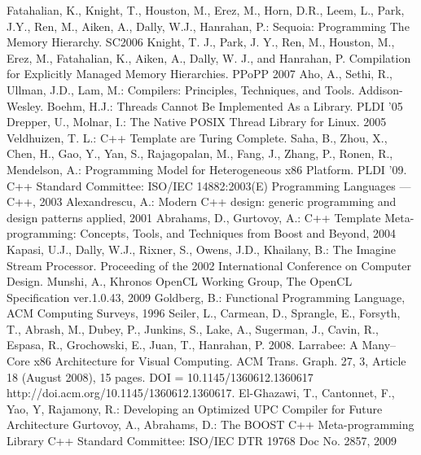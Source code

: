 \documentclass[10pt, conference, compsocconf]{IEEEtran}
\begin{document}
\begin{thebibliography}{99}
\setlength{\itemsep}{1mm}
 Fatahalian, K., Knight, T., Houston, M., Erez, M., Horn, D.R., Leem, L., Park, J.Y., Ren, M., Aiken, A., Dally, W.J., Hanrahan, P.: Sequoia: Programming The Memory Hierarchy. SC2006
 Knight, T. J., Park, J. Y., Ren, M., Houston, M., Erez, M., Fatahalian, K., Aiken, A., Dally, W. J., and Hanrahan, P. Compilation for Explicitly Managed Memory Hierarchies. PPoPP 2007
 Aho, A., Sethi, R., Ullman, J.D., Lam, M.: Compilers: Principles, Techniques, and Tools. Addison-Wesley. 
 Boehm, H.J.: Threads Cannot Be Implemented As a Library. PLDI '05
 Drepper, U., Molnar, I.: The Native POSIX Thread Library for Linux. 2005
 Veldhuizen, T. L.: C++ Template are Turing Complete. 
 Saha, B., Zhou, X., Chen, H., Gao, Y., Yan, S., Rajagopalan, M., Fang, J., Zhang, P., Ronen, R., Mendelson, A.: Programming Model for Heterogeneous x86 Platform. PLDI '09.
 C++ Standard Committee: ISO/IEC 14882:2003(E) Programming Languages — C++, 2003
 Alexandrescu, A.: Modern C++ design: generic programming and design patterns applied, 2001
 Abrahams, D., Gurtovoy, A.: C++ Template Meta-programming: Concepts, Tools, and Techniques from Boost and Beyond, 2004
 Kapasi, U.J., Dally, W.J., Rixner, S., Owens, J.D., Khailany, B.: The Imagine Stream Processor. Proceeding of the 2002 International Conference on Computer Design.
 Munshi, A., Khronos OpenCL Working Group, The OpenCL Specification ver.1.0.43, 2009
 Goldberg, B.: Functional Programming Language, ACM Computing Surveys, 1996
 Seiler, L., Carmean, D., Sprangle, E., Forsyth, T., Abrash, M., Dubey, P., Junkins, S., Lake, A., Sugerman, J., Cavin, R., Espasa, R., Grochowski, E., Juan, T., Hanrahan, P. 2008. Larrabee: A Many–Core x86 Architecture for Visual Computing. ACM Trans. Graph. 27, 3, Article 18 (August 2008), 15 pages. DOI = 10.1145/1360612.1360617 http://doi.acm.org/10.1145/1360612.1360617. 
 El-Ghazawi, T., Cantonnet, F., Yao, Y, Rajamony, R.: Developing an Optimized UPC Compiler for Future Architecture
 Gurtovoy, A., Abrahams, D.: The BOOST C++ Meta-programming Library
 C++ Standard Committee: ISO/IEC DTR 19768 Doc No. 2857, 2009
\end{thebibliography}




\end{document}
